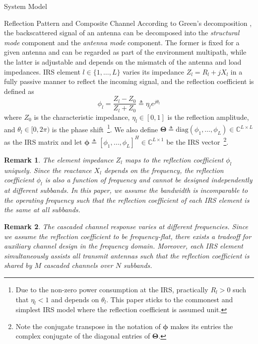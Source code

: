 \documentclass[journal]{IEEEtran}
\newtheorem{remark}{Remark}
\begin{document}
\begin{section}{System Model}
		\begin{subsection}{Reflection Pattern and Composite Channel}
			According to Green's decomposition \cite{Hansen1989}, the backscattered signal of an antenna can be decomposed into the \emph{structural mode} component and the \emph{antenna mode} component. The former is fixed for a given antenna and can be regarded as part of the environment multipath, while the latter is adjustable and depends on the mismatch of the antenna and load impedances. IRS element $l \in \{1, \dots, L\}$ varies its impedance $Z_l = R_l + j X_l$ in a fully passive manner to reflect the incoming signal, and the reflection coefficient is defined as
			\begin{equation}
				\phi_l = \frac{Z_l - Z_0}{Z_l + Z_0} \triangleq \eta_l e^{j\theta_l}
			\end{equation}
			where $Z_0$ is the characteristic impedance, $\eta_l \in [0, 1]$ is the reflection amplitude, and $\theta_l \in [0,2\pi)$ is the phase shift~\footnote{Due to the non-zero power consumption at the IRS, practically $R_l > 0$ such that $\eta_l < 1$ and depends on $\theta_l$. This paper sticks to the commonest and simplest IRS model where the reflection coefficient is assumed unit.}. We also define $\boldsymbol{\Theta} \triangleq \mathrm{diag}(\phi_1, \dots, \phi_L) \in \mathbb{C}^{L \times L}$ as the IRS matrix and let $\boldsymbol{\phi} \triangleq [\phi_1, \dots, \phi_L]^H \in \mathbb{C}^{L \times 1}$ be the IRS vector~\footnote{Note the conjugate transpose in the notation of $\boldsymbol{\phi}$ makes its entries the complex conjugate of the diagonal entries of $\boldsymbol{\Theta}$.}.

			\begin{remark}\label{re:reflection_coefficient}
				The element impedance $Z_l$ maps to the reflection coefficient $\phi_l$ uniquely. Since the reactance $X_l$ depends on the frequency, the reflection coefficient $\phi_l$ is also a function of frequency and cannot be designed independently at different subbands. In this paper, we assume the bandwidth is incomparable to the operating frequency such that the reflection coefficient of each IRS element is the same at all subbands.
			\end{remark}

			\begin{remark}\label{re:subband_tradeoff}
				The cascaded channel response varies at different frequencies. Since we assume the reflection coefficient to be frequency-flat, there exists a tradeoff for auxiliary channel design in the frequency domain. Moreover, each IRS element simultaneously assists all transmit antennas such that the reflection coefficient is shared by $M$ cascaded channels over $N$ subbands.
			\end{remark}


\end{subsection}
\end{section}
\end{document}
